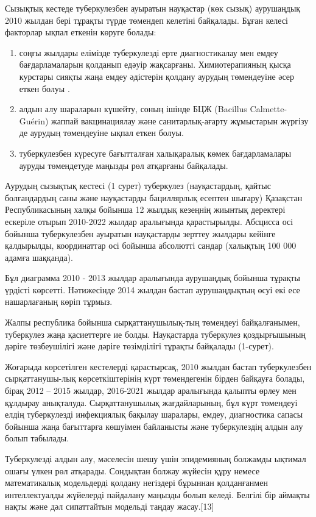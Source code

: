 \begin{multicols}{2}

Сызықтық кестеде туберкулезбен ауыратын науқастар (көк сызық) аурушаңдық
2010 жылдан бері тұрақты түрде төмендеп келетіні байқалады. Бұған келесі
факторлар ықпал еткенін көруге болады:

\begin{enumerate}
\def\labelenumi{\arabic{enumi})}\setlength{\itemindent}{1cm}

\item
  соңғы жылдары елімізде туберкулезді ерте диагностикалау мен емдеу
  бағдарламаларын қолданып едәуір жақсарғаны. Химиотерапияның қысқа
  курстары сияқты жаңа емдеу әдістерін қолдану аурудың төмендеуіне әсер
  еткен болуы .
\item
  алдын алу шараларын күшейту, соның ішінде БЦЖ (Bacillus
  Calmette-Guérin) жаппай вакцинациялау және санитарлық-ағарту
  жұмыстарын жүргізу де аурудың төмендеуіне ықпал еткен болуы.
\item
  туберкулезбен күресуге бағытталған халықаралық көмек бағдарламалары
  ауруды төмендетуде маңызды рөл атқарғаны байқалады.
\end{enumerate}

Аурудың сызықтық кестесі (1 сурет) туберкулез (науқастардың, қайтыс
болғандардың саны және науқастарды бациллярлық есептен шығару) Қазақстан
Республикасының халқы бойынша 12 жылдық кезеңнің жиынтық деректері
ескеріле отырып 2010-2022 жылдар аралығында қарастырылды. Абсцисса осі
бойынша туберкулезбен ауыратын науқастарды зерттеу жылдары кейінге
қалдырылды, координаттар осі бойынша абсолютті сандар (халықтың 100 000
адамға шаққанда).

Бұл диаграмма 2010 - 2013 жылдар аралығында аурушаңдық бойынша тұрақты
үрдісті көрсетті. Нәтижесінде 2014 жылдан бастап аурушаңдықтың өсуі екі
есе нашарлағаның көріп тұрмыз.

Жалпы республика бойынша сырқаттанушылық-тың төмендеуі байқалғанымен,
туберкулез жаңа қасиеттерге ие болды. Науқастарда туберкулез
қоздырғышының дәріге төзбеушілігі және дәріге төзімділігі тұрақты
байқалады (1-сурет).

Жоғарыда көрсетілген кестелерді қарастырсақ, 2010 жылдан бастап
туберкулезбен сырқаттанушы-лық көрсеткіштерінің күрт төмендегенін бірден
байқауға болады, бірақ 2012 -- 2015 жылдар, 2016-2021 жылдар аралығында
қалыпты өрлеу мен құлдырау анықталуда. Сырқаттанушылық жағдайларының,
бұл күрт төмендеуі елдің туберкулезді инфекциялық бақылау шаралары,
емдеу, диагностика сапасы бойынша жаңа бағыттарға көшуімен байланысты
және туберкулездің алдын алу болып табылады.

Туберкулезді алдын алу, мәселесін шешу үшін эпидемияның болжамды ықтимал
ошағы үлкен рөл атқарады. Сондықтан болжау жүйесін құру немесе
математикалық модельдерді қолдану негіздері бұрыннан қолданғанмен
интеллектуалды жүйелерді пайдалану маңызды болып келеді. Белгілі бір
аймақты нақты және дәл сипаттайтын модельді таңдау жасау.{[}13{]}
\end{multicols}

